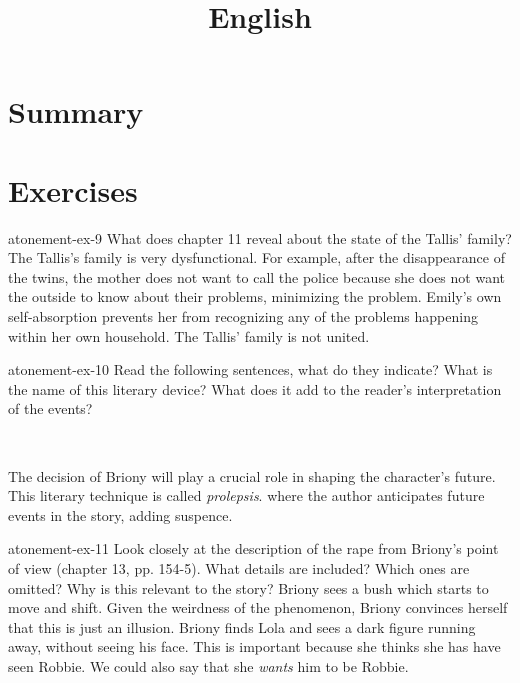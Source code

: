 \documentclass[preview]{standalone}
\begin{document}
\title{English}
\genpage

\section{Summary}

\section{Exercises}

\begin{snippetexercise}{atonement-ex-9}%
    {What does chapter 11 reveal about the state of the Tallis' family?}
    The Tallis's family is very dysfunctional.
    For example, after the disappearance of the twins,
    the mother does not want to call the police because she does not want
    the outside to know about their problems, minimizing the problem.
    Emily's own self-absorption prevents her from recognizing any of the problems
    happening within her own household. The Tallis' family is not united.
\end{snippetexercise}

\begin{snippetexercise}{atonement-ex-10}%
    {Read the following sentences, what do they indicate?
    What is the name of this literary device? What does
    it add to the reader's interpretation of the events?}
    \begin{center}
         \\
    \end{center}
    The decision of Briony will play a crucial role in shaping the character's future.
    This literary technique is called \textit{prolepsis}.
    where the author anticipates future events in the story, adding suspence.
\end{snippetexercise}

\begin{snippetexercise}{atonement-ex-11}%
    {Look closely at the description of the rape from Briony's point of view (chapter 13, pp. 154-5).
    What details are included? Which ones are omitted? Why is this relevant to the story?}
    Briony sees a bush which starts to move and shift. Given the weirdness of the phenomenon,
    Briony convinces herself that this is just an illusion.
    Briony finds Lola and sees a dark figure running away, without seeing his face.
    This is important because she thinks she has have seen Robbie.
    We could also say that she \textit{wants} him to be Robbie.
\end{snippetexercise}
\end{document}
